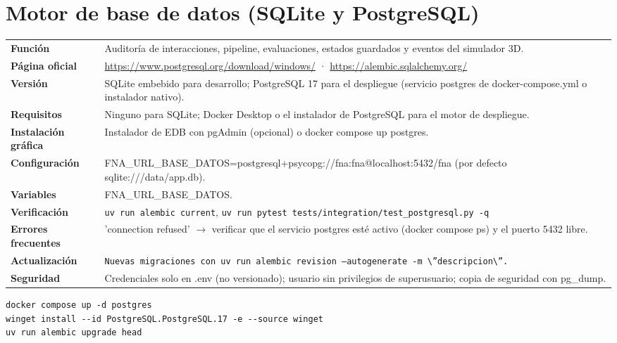 \section{Motor de base de datos (SQLite y PostgreSQL)}
{\small\begin{tabularx}{\linewidth}{@{}>{\bfseries}p{2.9cm}X@{}}\toprule
Función & Auditoría de interacciones, pipeline, evaluaciones, estados guardados y eventos del simulador 3D.\\
Página oficial & \url{https://www.postgresql.org/download/windows/} · \url{https://alembic.sqlalchemy.org/}\\
Versión & SQLite embebido para desarrollo; PostgreSQL 17 para el despliegue (servicio postgres de docker-compose.yml o instalador nativo).\\
Requisitos & Ninguno para SQLite; Docker Desktop o el instalador de PostgreSQL para el motor de despliegue.\\
Instalación gráfica & Instalador de EDB con pgAdmin (opcional) o docker compose up postgres.\\
Configuración & FNA\_URL\_BASE\_DATOS=postgresql+psycopg://fna:fna@localhost:5432/fna (por defecto sqlite:///data/app.db).\\
Variables & FNA\_URL\_BASE\_DATOS.\\
Verificación & \texttt{uv run alembic current}, \texttt{uv run pytest tests/integration/test\_postgresql.py -q}\\
Errores frecuentes & 'connection refused' $\rightarrow$ verificar que el servicio postgres esté activo (docker compose ps) y el puerto 5432 libre.\\
Actualización & \texttt{Nuevas migraciones con uv run alembic revision --autogenerate -m \textbackslash{}''descripcion\textbackslash{}''.}\\
Seguridad & Credenciales solo en .env (no versionado); usuario sin privilegios de superusuario; copia de seguridad con pg\_dump.\\
\bottomrule\end{tabularx}}
\begin{lstlisting}[style=ps]
docker compose up -d postgres
winget install --id PostgreSQL.PostgreSQL.17 -e --source winget
uv run alembic upgrade head
\end{lstlisting}

